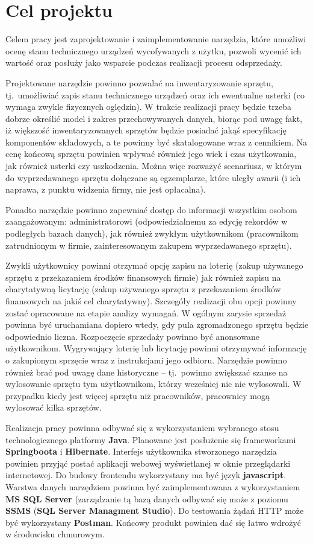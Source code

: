    
\section{Cel projektu}
Celem pracy jest zaprojektowanie i zaimplementowanie narzędzia, które umożliwi ocenę stanu technicznego urządzeń wycofywanych z użytku, pozwoli wycenić ich wartość oraz posłuży jako wsparcie podczas realizacji procesu odsprzedaży. 

Projektowane narzędzie powinno pozwalać na inwentaryzowanie sprzętu, tj.\ umożliwiać zapis stanu technicznego urządzeń oraz ich ewentualne usterki (co wymaga zwykle fizycznych oględzin). W trakcie realizacji pracy będzie trzeba dobrze określić model i zakres przechowywanych danych, biorąc pod uwagę fakt, iż większość inwentaryzowanych sprzętów będzie posiadać jakąś specyfikację komponentów składowych, a te powinny być skatalogowane wraz z cennikiem. Na cenę końcową sprzętu powinien wpływać również jego 
wiek i czas użytkowania, jak również usterki czy uszkodzenia. Można więc rozważyć scenariusz, w którym do wyprzedawanego sprzętu dołączane są egzemplarze, które uległy awarii (i ich naprawa, z punktu widzenia firmy, nie jest opłacalna).


Ponadto narzędzie powinno zapewniać dostęp do informacji wszystkim osobom zaangażowanym: administratorowi (odpowiedzialnemu za edycję rekordów w podległych bazach danych),
jak również zwykłym użytkownikom (pracownikom zatrudnionym w firmie, zainteresowanym zakupem wyprzedawanego sprzętu). 

Zwykli użytkownicy powinni otrzymać opcję zapisu na loterię (zakup używanego sprzętu z przekazaniem środków finansowych firmie) jak również zapisu na charytatywną licytację (zakup używanego sprzętu z przekazaniem środków finansowych na jakiś cel charytatywny). Szczegóły realizacji obu opcji powinny zostać opracowane na etapie analizy wymagań. W ogólnym zarysie sprzedaż powinna być uruchamiana dopiero wtedy, gdy pula zgromadzonego sprzętu będzie odpowiednio liczna. 
Rozpoczęcie sprzedaży powinno być anonsowane użytkownikom. Wygrywający loterię lub licytację powinni otrzymywać informację o zakupionym sprzęcie wraz z instrukcjami jego odbioru. Narzędzie powinno również brać pod uwagę dane historyczne -- tj.\ powinno zwiększać szanse na wylosowanie sprzętu tym użytkownikom, którzy wcześniej nic nie wylosowali. W przypadku kiedy jest więcej sprzętu niż pracowników, pracownicy mogą wylosować kilka sprzętów.

Realizacja pracy powinna odbywać się z wykorzystaniem wybranego stosu technologicznego platformy \textbf{Java}. Planowane jest posłużenie się frameworkami \textbf{Springboota} i \textbf{Hibernate}. Interfejs użytkownika stworzonego narzędzia powinien przyjąć postać aplikacji webowej wyświetlanej w oknie przeglądarki internetowej. Do budowy frontendu wykorzystany ma być język \textbf{javascript}. Warstwa danych narzędziem powinna być zaimplementowana z wykorzystaniem \textbf{MS SQL Server} (zarządzanie tą bazą danych odbywać się może z poziomu  \textbf{SSMS} (\textbf{SQL Server Managment Studio}). Do testowania żądań HTTP może być wykorzystany \textbf{Postman}. Końcowy produkt powinien dać się łatwo wdrożyć w środowisku chmurowym.


